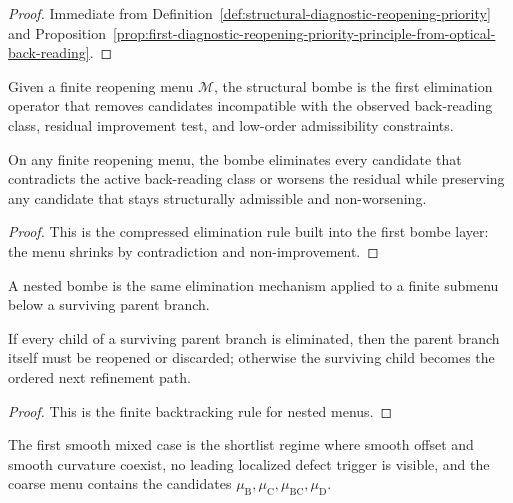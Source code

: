\begin{proof}
Immediate from Definition~\ref{def:structural-diagnostic-reopening-priority} and Proposition~\ref{prop:first-diagnostic-reopening-priority-principle-from-optical-back-reading}.
\end{proof}

\begin{definition}
\label{def:structural-bombe-on-a-reopening-menu}
Given a finite reopening menu $\mathcal M$, the structural bombe is the first elimination operator that removes candidates incompatible with the observed back-reading class, residual improvement test, and low-order admissibility constraints.
\end{definition}

\begin{proposition}
\label{prop:first-structural-bombe-elimination-principle-on-reopening-menus}
On any finite reopening menu, the bombe eliminates every candidate that contradicts the active back-reading class or worsens the residual while preserving any candidate that stays structurally admissible and non-worsening.
\end{proposition}

\begin{proof}
This is the compressed elimination rule built into the first bombe layer: the menu shrinks by contradiction and non-improvement.
\end{proof}

\begin{definition}
\label{def:nested-structural-bombe}
A nested bombe is the same elimination mechanism applied to a finite submenu below a surviving parent branch.
\end{definition}

\begin{proposition}
\label{prop:nested-bombe-backtracking-principle}
If every child of a surviving parent branch is eliminated, then the parent branch itself must be reopened or discarded; otherwise the surviving child becomes the ordered next refinement path.
\end{proposition}

\begin{proof}
This is the finite backtracking rule for nested menus.
\end{proof}

\begin{definition}
\label{def:first-smooth-mixed-shortlist-case}
The first smooth mixed case is the shortlist regime where smooth offset and smooth curvature coexist, no leading localized defect trigger is visible, and the coarse menu contains the candidates $\mu_{\mathrm B},\mu_{\mathrm C},\mu_{\mathrm{BC}},\mu_{\mathrm D}$.
\end{definition}

